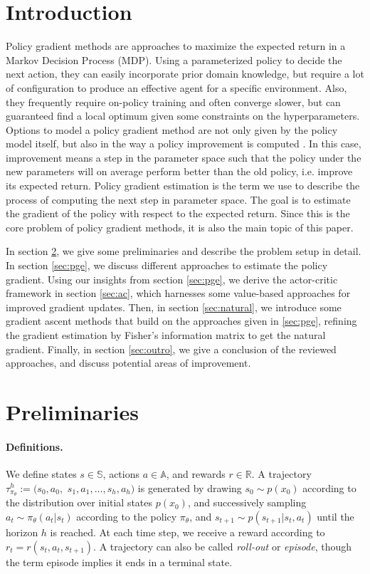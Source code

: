 \section{Introduction}
\label{intro}

Policy gradient methods are approaches to maximize the expected return in a Markov Decision Process (MDP). 
Using a parameterized policy to decide the next action, they can easily incorporate prior domain knowledge, but require a lot of configuration to produce an effective agent for a specific environment. 
Also, they frequently require on-policy training and often converge slower, but can guaranteed find a local optimum given some constraints on the hyperparameters. 
Options to model a policy gradient method are not only given by the policy model itself, but also in the way a policy improvement is computed \cite{DBLP:journals/corr/SchulmanMLJA15}. 
In this case, improvement means a step in the parameter space such that the policy under the new parameters will on average perform better than the old policy, i.e. improve its expected return. 
Policy gradient estimation is the term we use to describe the process of computing the next step in parameter space. 
The goal is to estimate the gradient of the policy with respect to the expected return. 
Since this is the core problem of policy gradient methods, it is also the main topic of this paper.

In section \ref{sec:prel}, we give some preliminaries and describe the problem setup in detail. 
In section \ref{sec:pge}, we discuss different approaches to estimate the policy gradient. 
Using our insights from section \ref{sec:pge}, we derive the actor-critic framework in section \ref{sec:ac}, which harnesses some value-based approaches for improved gradient updates. 
Then, in section \ref{sec:natural}, we introduce some gradient ascent methods that build on the approaches given in \ref{sec:pge}, refining the gradient estimation by Fisher's information matrix to get the natural gradient. 
Finally, in section \ref{sec:outro}, we give a conclusion of the reviewed approaches, and discuss potential areas of improvement.

\section{Preliminaries}
\label{sec:prel}

\paragraph{Definitions.} 
We define states $s \in \mathbb{S}$, actions $a \in \mathbb{A}$, and rewards $r \in \mathbb{R}$. 
A trajectory $\tau_{\pi_\theta}^h := (s_0, a_0, $ $s_1, a_1, \dots, s_h, a_h)$ is generated by drawing $s_0 \sim p(x_0)$ according to the distribution over initial states $p(x_0)$, and successively sampling $a_t \sim \pi_\theta(a_t|s_t)$ according to the policy $\pi_\theta$, and $s_{t+1} \sim p(s_{t+1}|s_t,a_t)$ until the horizon $h$ is reached. 
At each time step, we receive a reward according to $r_t = r(s_t, a_t, s_{t+1})$. 
A trajectory can also be called \textit{roll-out} or \textit{episode}, though the term episode implies it ends in a terminal state.

